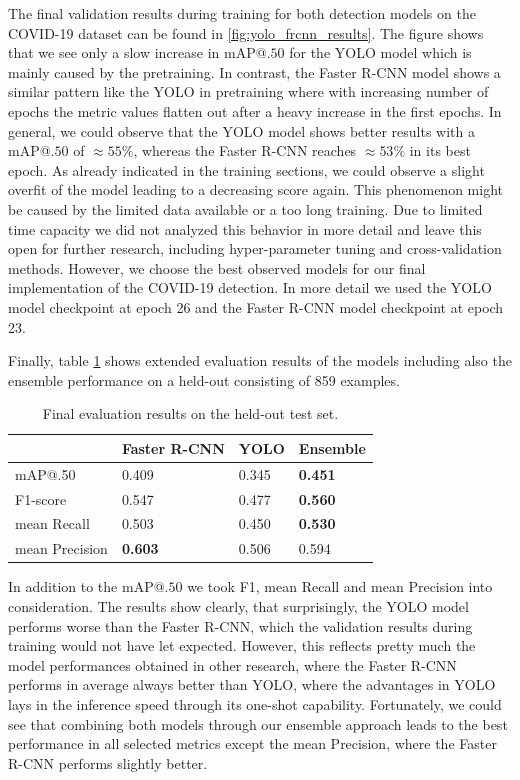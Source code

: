 The final validation results during training for both detection models on the COVID-19 dataset can be found in \ref{fig:yolo_frcnn_results}. The figure shows that we see only a slow increase in \ac{mAP}@$.50$ for the \ac{YOLO} model which is mainly caused by the pretraining. In contrast, the Faster \ac{R-CNN} model shows a similar pattern like the \ac{YOLO} in pretraining where with increasing number of epochs the metric values flatten out after a heavy increase in the first epochs. In general, we could observe that the \ac{YOLO} model shows better results with a \ac{mAP}@$.50$ of $\approx 55\%$, whereas the Faster \ac{R-CNN} reaches $\approx 53\%$ in its best epoch. As already indicated in the training sections, we could observe a slight overfit of the model leading to a decreasing score again. This phenomenon might be caused by the limited data available or a too long training. Due to limited time capacity we did not analyzed this behavior in more detail and leave this open for further research, including hyper-parameter tuning and cross-validation methods.
However, we choose the best observed models for our final implementation of the COVID-19 detection. In more detail we used the \ac{YOLO} model checkpoint at epoch 26 and the Faster \ac{R-CNN} model checkpoint at epoch 23.

Finally, table \ref{table:final_results} shows extended evaluation results of the models including also the ensemble performance on a held-out consisting of 859 examples. 
\begin{table}[h]
	\begin{tabular}{l|l|l|l}
		&    Faster R-CNN          &         YOLO             &  Ensemble \\ \hline
		mAP@.50			& \multicolumn{1}{l|}{0.409} & \multicolumn{1}{l|}{0.345} & \textbf{0.451}  \\
		F1-score		& \multicolumn{1}{l|}{0.547} & \multicolumn{1}{l|}{0.477} & \textbf{0.560} \\
		mean Recall		& \multicolumn{1}{l|}{0.503} & \multicolumn{1}{l|}{0.450} & \textbf{0.530} \\
		mean Precision	& \multicolumn{1}{l|}{\textbf{0.603}} & \multicolumn{1}{l|}{0.506} & 0.594 \\
	\end{tabular}
	\centering
	\caption{Final evaluation results on the held-out test set.}
	\label{table:final_results}
\end{table}

In addition to the \ac{mAP}@$.50$ we took F1, mean Recall and mean Precision into consideration. The results show clearly, that surprisingly, the \ac{YOLO} model performs worse than the Faster \ac{R-CNN}, which the validation results during training would not have let expected. However, this reflects pretty much the model performances obtained in other research, where the Faster \ac{R-CNN} performs in average always better than \ac{YOLO}, where the advantages in \ac{YOLO} lays in the inference speed through its one-shot capability. Fortunately, we could see that combining both models through our ensemble approach leads to the best performance in all selected metrics except the mean Precision, where the Faster \ac{R-CNN} performs slightly better.

